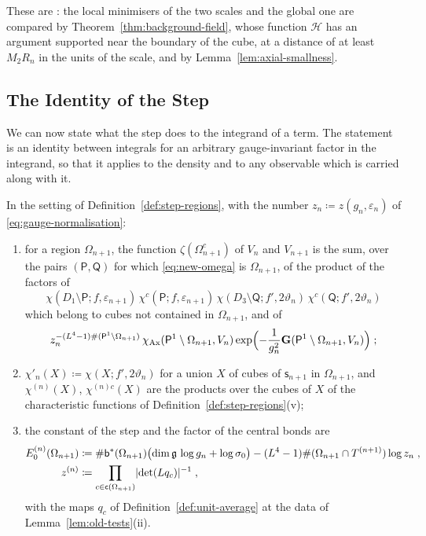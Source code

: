 \documentclass[11pt]{preprint}
\DeclarePairedDelimiter{\abs}{\lvert}{\rvert}
\numberwithin{equation}{section}
\begin{document}
These are \cite[(3.6)--(3.9), (3.12)--(3.14), (3.17)--(3.19), pp.~266--269]{BalabanCRE}: the local minimisers of the two scales and the global one are compared by Theorem~\ref{thm:background-field}, whose function $\mathcal H$ has an argument supported near the boundary of the cube, at a distance of at least $M_2R_n$ in the units of the scale, and by Lemma~\ref{lem:axial-smallness}.

\subsection{The Identity of the Step}\label{sec:step-identity}

We can now state what the step does to the integrand of a term. The statement is an identity between integrals for an arbitrary gauge-invariant factor in the integrand, so that it applies to the density and to any observable which is carried along with it.

\begin{definition}\label{def:step-weights}
In the setting of Definition~\ref{def:step-regions}, with the number $z_n \coloneqq z(g_n, \varepsilon_n)$ of \eqref{eq:gauge-normalisation}:
\begin{enumerate}[label=(\roman*)]
\item for a region $\Omega_{n+1}$, the function $\zeta(\Omega^c_{n+1})$ of $V_n$ and $V_{n+1}$ is the sum, over the pairs $(\mathsf P, \mathsf Q)$ for which \eqref{eq:new-omega} is $\Omega_{n+1}$, of the product of the factors of
\[
    \chi(D_1 \setminus \mathsf P; f, \varepsilon_{n+1})\,\chi^c(\mathsf P; f, \varepsilon_{n+1})\,\chi(D_3 \setminus \mathsf Q; f', 2\vartheta_n)\,\chi^c(\mathsf Q; f', 2\vartheta_n)
\]
which belong to cubes not contained in $\Omega_{n+1}$, and of
\[
    z_n^{-(L^4-1)\#(\mathsf P^1 \setminus \Omega_{n+1})}\,\chi_{\mathrm{Ax}}(\mathsf P^1 \setminus \Omega_{n+1}, V_n)\exp\Bigl(-\frac{1}{g_n^2}\mathbf G(\mathsf P^1 \setminus \Omega_{n+1}, V_n)\Bigr)\;;
\]
\item $\chi'_n(X) \coloneqq \chi(X; f', 2\vartheta_n)$ for a union $X$ of cubes of $\mathsf s_{n+1}$ in $\Omega_{n+1}$, and $\chi^{(n)}(X)$, $\chi^{(n)c}(X)$ are the products over the cubes of $X$ of the characteristic functions of Definition~\ref{def:step-regions}(v);
\item the constant of the step and the factor of the central bonds are
\begin{equation}\label{eq:step-constant}
\begin{aligned}
    E^{(n)}_0(\Omega_{n+1}) &\coloneqq \#\mathsf b^*(\Omega_{n+1})\bigl(\dim\mathfrak g\,\log g_n + \log\sigma_0\bigr) - (L^4 - 1)\#(\Omega_{n+1} \cap T^{(n+1)})\log z_n\;,\\
    z^{(n)} &\coloneqq \prod_{c \in \mathsf c(\Omega_{n+1})}\abs{\det(Lq_c)}^{-1}\;,
\end{aligned}
\end{equation}
with the maps $q_c$ of Definition~\ref{def:unit-average} at the data of Lemma~\ref{lem:old-tests}(ii).
\end{enumerate}
\end{definition}
\end{document}
